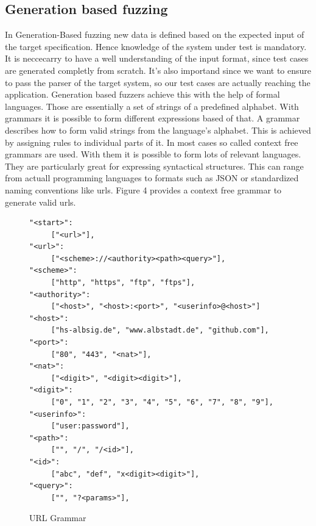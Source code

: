\documentclass[journal=tosc,final]{iacrtrans}
\begin{document}
\subsection{Generation based fuzzing}
In Generation-Based fuzzing new data is defined based on the expected input of the target specification. Hence knowledge of the system under test is mandatory. It is neccecarry to have a well understanding of the input format, since test cases are generated completly from scratch. It's also importand since we want to ensure to pass the parser of the target system, so our test cases are actually reaching the application.
Generation based fuzzers achieve this with the help of formal languages. Those are essentially a set of strings of a predefined alphabet. With grammars it is possible to form different expressions based of that. A grammar describes how to form valid strings from the language's alphabet. This is achieved by assigning rules to individual parts of it.
In most cases so called context free grammars are used. With them it is possible to form lots of relevant languages. They are particularly great for expressing syntactical structures. This can range from actuall programming languages to formats such as JSON or standardized naming conventions like urls. Figure 4 provides a context free grammar to generate valid urls.
\begin{figure}[h]
 \caption{URL Grammar}
 \begin{center}
\begin{shaded}
\begin{internallinenumbers}
\begin{verbatim}
"<start>":
     ["<url>"],
"<url>":
     ["<scheme>://<authority><path><query>"],
"<scheme>":
     ["http", "https", "ftp", "ftps"],
"<authority>":
     ["<host>", "<host>:<port>", "<userinfo>@<host>"]
"<host>":  
     ["hs-albsig.de", "www.albstadt.de", "github.com"],
"<port>":
     ["80", "443", "<nat>"],
"<nat>":
     ["<digit>", "<digit><digit>"],
"<digit>":
     ["0", "1", "2", "3", "4", "5", "6", "7", "8", "9"],
"<userinfo>":  
     ["user:password"],
"<path>":  
     ["", "/", "/<id>"],
"<id>":  
     ["abc", "def", "x<digit><digit>"],
"<query>":
     ["", "?<params>"],
\end{verbatim}
\end{internallinenumbers}
\end{shaded}
\end{center}

\end{figure}
\end{document}
